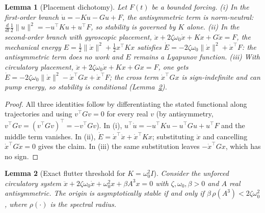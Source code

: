 \documentclass{article}
\newtheorem{lemma}{Lemma}
\begin{document}
{\begin{lemma}[Placement dichotomy]\label{lem:placement-proof}
Let $F(t)$ be a bounded forcing. (i) In the first-order branch
$\dot u = -Ku - Gu + F$, the antisymmetric term is norm-neutral:
$\tfrac{d}{dt}\tfrac12\|u\|^2 = -u^\top K u + u^\top F$, so stability is
governed by $K$ alone. (ii) In the second-order branch with
\emph{gyroscopic} placement, $\ddot x + 2\zeta\omega_0\dot x + Kx +
G\dot x = F$, the mechanical energy
$E=\tfrac12\|\dot x\|^2+\tfrac12 x^\top Kx$ satisfies
$\dot E = -2\zeta\omega_0\|\dot x\|^2 + \dot x^\top F$: the antisymmetric
term does no work and $E$ remains a Lyapunov function. (iii) With
\emph{circulatory} placement, $\ddot x + 2\zeta\omega_0\dot x + Kx + Gx
= F$, one gets $\dot E = -2\zeta\omega_0\|\dot x\|^2 - \dot x^\top Gx +
\dot x^\top F$; the cross term $\dot x^\top Gx$ is sign-indefinite and
can pump energy, so stability is conditional (Lemma~\ref{lem:flutter}).
\end{lemma}

\begin{proof}
All three identities follow by differentiating the stated functional
along trajectories and using $v^\top G v=0$ for every real $v$ (by
antisymmetry, $v^\top Gv = (v^\top Gv)^\top = -v^\top Gv$). In (i),
$u^\top\dot u = -u^\top Ku - u^\top Gu + u^\top F$ and the middle term
vanishes. In (ii), $\dot E = \dot x^\top\ddot x + \dot x^\top Kx$;
substituting $\ddot x$ and cancelling $\dot x^\top G\dot x = 0$ gives
the claim. In (iii) the same substitution leaves $-\dot x^\top Gx$,
which has no sign.
\end{proof}

\begin{lemma}[Exact flutter threshold for $K=\omega_0^2 I$]
\label{lem:flutter}
Consider the unforced circulatory system
$\ddot x + 2\zeta\omega_0\dot x + \omega_0^2 x + \beta A^3 x = 0$ with
$\zeta,\omega_0,\beta>0$ and $A$ real antisymmetric. The origin is
asymptotically stable if and only if
$\beta\,\rho(A^3) < 2\zeta\omega_0^2$,
where $\rho(\cdot)$ is the spectral radius.
\end{lemma}

}
\end{document}
